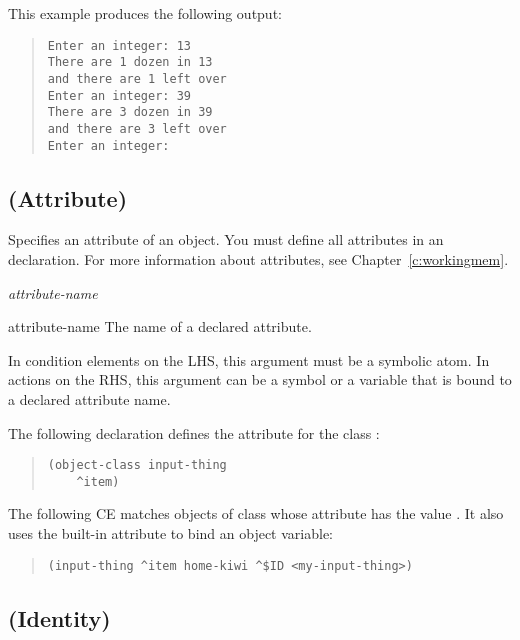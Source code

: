 This example produces the following output:

\begin{quote}
\begin{verbatim}
Enter an integer: 13
There are 1 dozen in 13
and there are 1 left over
Enter an integer: 39
There are 3 dozen in 39
and there are 3 left over
Enter an integer:
\end{verbatim}
\end{quote}

\subsection{\co{\^} (Attribute)}

Specifies an attribute of an object. You must define all attributes in
an  declaration. For more information about
attributes, see Chapter~\ref{c:workingmem}.

\Format

\ct\it{attribute-name}

\begin{arguments}
\item[attribute-name] The name of a declared attribute.

  In condition elements on the LHS, this argument must be a symbolic
  atom. In actions on the RHS, this argument can be a symbol or a
  variable that is bound to a declared attribute name.
\end{arguments}

\Example

The following  declaration defines the attribute
 for the class :

\begin{quote}
\begin{verbatim}
(object-class input-thing
    ^item)
\end{verbatim}
\end{quote}

The following CE matches objects of class  whose
 attribute has the value . It also uses the
built-in attribute  to bind an object variable:

\begin{quote}
\begin{verbatim}
(input-thing ^item home-kiwi ^$ID <my-input-thing>)
\end{verbatim}
\end{quote}

\subsection{\co{==} (Identity)}

